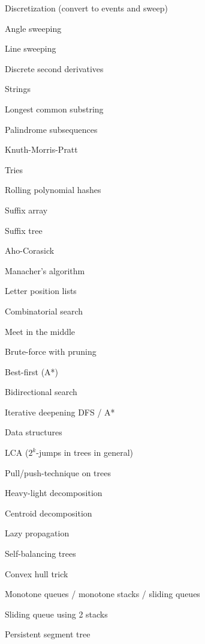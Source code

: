 \begin{myitemize}
\begin{myitemize}
	\item Discretization (convert to events and sweep)
	\item Angle sweeping
	\item Line sweeping
	\item Discrete second derivatives
\end{myitemize}
\item Strings
\begin{myitemize}
	\item Longest common substring
	\item Palindrome subsequences
	\item Knuth-Morris-Pratt
	\item Tries
	\item Rolling polynomial hashes
	\item Suffix array
	\item Suffix tree
	\item Aho-Corasick
	\item Manacher's algorithm
	\item Letter position lists
\end{myitemize}
\item Combinatorial search
\begin{myitemize}
	\item Meet in the middle
	\item Brute-force with pruning
	\item Best-first (A*)
	\item Bidirectional search
	\item Iterative deepening DFS / A*
\end{myitemize}
\item Data structures
\begin{myitemize}
	\item LCA ($2^k$-jumps in trees in general)
	\item Pull/push-technique on trees
	\item Heavy-light decomposition
	\item Centroid decomposition
	\item Lazy propagation
	\item Self-balancing trees
	\item Convex hull trick
	\item Monotone queues / monotone stacks / sliding queues
	\item Sliding queue using 2 stacks
	\item Persistent segment tree
\end{myitemize}
\end{myitemize}
